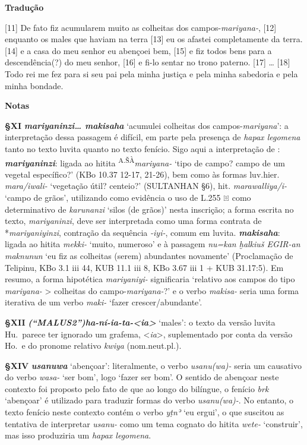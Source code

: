 \bigskip%
\noindent\textbf{Tradução}

[11] De fato fiz acumularem muito as colheitas dos campos-\emph{mariyana-}, [12]
enquanto os males que haviam na terra [13] eu os afastei completamente da terra.
	[14] e a casa do meu senhor eu abençoei bem, [15] e fiz todos bens para a
descendência{(?)} do meu senhor, [16] e fi-lo sentar no trono paterno. [17]
\ldots{} [18] Todo rei me fez para si seu pai pela minha justiça e pela minha
sabedoria e pela minha bondade.

\bigskip
\noindent\textbf{Notas}

\smallskip
\noindent\textbf{§XI}\tabto{2em}
\textbf{\emph{mariyaninzi\ldots{} makisaha}} `acumulei
colheitas dos campos-\emph{mariyana}': a interpretação dessa passagem
é difícil, em parte pela presença de \emph{hapax legomena} tanto no texto luvita
quanto no texto fenício.
Sigo aqui a interpretação de \citet{VanDenHout2010}:
\textbf{\emph{mariyaninzi}}: ligada ao hitita
\textsuperscript{A.ŠÀ}\emph{mariyana-} `tipo de
campo? campo de um vegetal específico?' (KBo 10.37 12-17, 21-26), bem como às
formas luv.hier. \emph{mara/iwali-} `vegetação útil? centeio?' (SULTANHAN §6),
hit. \emph{marawalliya/i-} `campo de grãos', utilizando como evidência o uso de
L.255 𔔡 como determinativo de \emph{karunanzi} `silos (de grãos)' nesta
inscrição;
a forma escrita no texto, \emph{mariyaninzi}, deve ser interpretada como uma
forma contrata de *\emph{mariyaniyinzi}, contração da sequência \emph{-iyi-},
comum em luvita.
\textbf{\emph{makisaha}}: ligada ao hitita \emph{mekki-} `muito, numeroso' e à
passagem \emph{nu=kan ḫalkiuš EGIR-an maknunun} `eu fiz as colheitas (serem)
abundantes novamente' (Proclamação de Telipinu, KBo 3.1 iii 44, KUB 11.1 iii 8,
KBo 3.67 iii 1 + KUB 31.17:5).
Em resumo, a forma hipotética \emph{mariyaniyi-} significaria `relativo aos
campos do tipo \emph{mariyana-} > colheitas do campo-\emph{mariyana-}?' e o
verbo \emph{makisa-} seria uma forma iterativa de um verbo \emph{maki-} `fazer
crescer/abundante'.


\smallskip
\noindent\textbf{§XII}\tabto{2em}
\textbf{\emph{\emph{(“MALUS2”)}ha-ní-ia-ta-<ia>}} `males': o texto da versão
luvita Hu.\ parece ter ignorado um grafema, <\emph{ia}>, suplementado por conta
da versão Ho.\ e do pronome relativo \emph{kwiya} (nom.neut.pl.).

\smallskip
\noindent\textbf{§XIV}\tabto{2em}
\textbf{\emph{usanuwa}} `abençoar': literalmente, o verbo \emph{usanu{(wa)}-}
seria um causativo do verbo \emph{wasa-} `ser bom', logo `fazer ser
bom'. O sentido de abençoar neste contexto foi proposto pelo fato de que ao
longo do bilíngue, o fenício \emph{brk} `abençoar' é utilizado para traduzir
formas do verbo \emph{usanu{(wa)}-}.
No entanto, o texto fenício neste contexto contém o verbo \emph{yṭnʾ} `eu
ergui', o que suscitou as tentativa de interpretar \emph{usanu-} como um tema
cognato do hitita \emph{wete-} `construir', mas isso produziria um \emph{hapax
	legomena}.


